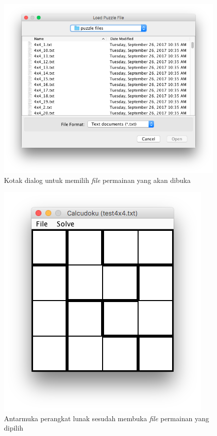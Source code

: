 \begin{figure}
\centering
\captionsetup{justification=centering}
\includegraphics[scale=0.5]{Gambar/ImplementasiPengujian/FileChooser.png}
\caption[Kotak dialog untuk memilih \textit{file} permainan yang akan dibuka]{Kotak dialog untuk memilih \textit{file} permainan yang akan dibuka}
\label{fig:antarmukapl2}
\end{figure}

\begin{figure}
\centering
\captionsetup{justification=centering}
\includegraphics[scale=0.5]{Gambar/ImplementasiPengujian/Calcudoku2.png}
\caption[Antarmuka perangkat lunak sesudah membuka \textit{file} permainan yang dipilih]{Antarmuka perangkat lunak sesudah membuka \textit{file} permainan yang dipilih}
\label{fig:antarmukapl3}
\end{figure}

